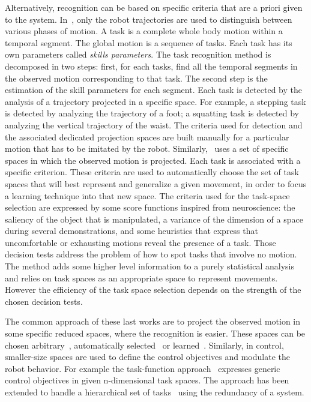 \documentclass[journal]{IEEEtran}
\begin{document}
Alternatively, recognition can be based on specific criteria that are a priori given
to the system. In~\cite{nakaoka07}, only the robot trajectories
are used to distinguish between various phases of motion. A task is
a complete whole body motion within a temporal segment. The global motion
is a sequence of tasks. Each task has its own
parameters called \emph{skills parameters}. The task recognition method is decomposed in two steps:
first, for each tasks, find all the temporal segments in the observed motion
corresponding to that task.
The second step is the estimation of the skill parameters for each segment.
Each task is detected by the analysis of a trajectory projected in a specific space.
For example, a stepping task is detected by analyzing the trajectory
of a foot; a squatting task is detected by analyzing the vertical trajectory of the waist.
The criteria used for detection and the associated dedicated projection spaces
are built manually for a particular motion that has to be imitated by the robot.
Similarly,~\cite{muhlig09} uses a set of specific spaces
in which the observed motion is projected. Each task is associated with a specific criterion. These criteria
are used to automatically choose the set of task spaces that will best
represent and generalize a given movement, in order to focus
a learning technique into that new space. The criteria used for the task-space selection
are expressed by some score functions inspired from neuroscience:
the saliency of the object that is manipulated, a variance of the dimension
of a space during several demonstrations, and some heuristics that express that
uncomfortable or exhausting motions reveal the presence of a task. Those decision tests
address the problem of how to spot tasks that involve no motion. The method
adds some higher level information to a purely statistical analysis and relies
on task spaces as an appropriate space to represent movements. However
the efficiency of the task space selection depends on the strength
of the chosen decision tests.

The common approach of these last works are to project the observed motion in some specific reduced spaces,
where the recognition is easier. These spaces can be chosen arbitrary~\cite{nakaoka07},
automatically selected~\cite{muhlig09} or learned~\cite{peters08}. Similarly, in control,
smaller-size spaces are used to define the control objectives and modulate the robot behavior.
For example the task-function approach~\cite{samson91} expresses generic control objectives in
given n-dimensional task spaces.
The approach has been extended to handle a hierarchical set of tasks~\cite{siciliano91, nakamura87}
using the redundancy of a system.
\medskip
\end{document}

